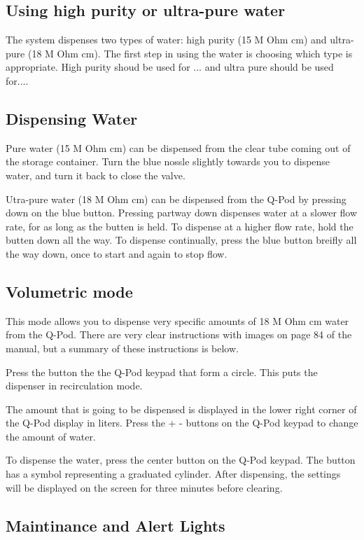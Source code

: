 \documentclass[12pt]{../SOP3_beta}\usepackage[]{graphicx}\usepackage[]{color}
\begin{document}
\subsection{Using high purity or ultra-pure water}

\NP The system dispenses two types of water: high purity (15 M Ohm cm) and ultra-pure (18 M Ohm cm). The first step in using the water is choosing which type is appropriate. High purity shoud be used for ... and ultra pure should be used for....

\subsection{Dispensing Water}

\NP Pure water (15 M Ohm cm) can be dispensed from the clear tube coming out of the storage container. Turn the blue nossle slightly towards you to dispense water, and turn it back to close the valve. 

\NP Utra-pure water (18 M Ohm cm) can be dispensed from the Q-Pod by pressing down on the blue button. Pressing partway down dispenses water at a slower flow rate, for as long as the butten is held. To dispense at a higher flow rate, hold the butten down all the way. To dispense continually, press the blue button breifly all the way down, once to start and again to stop flow.  

\subsection{Volumetric mode}

\NP This mode allows you to dispense very specific amounts of 18 M Ohm cm water from the Q-Pod. There are very clear instructions with images on page 84 of the manual, but a summary of these instructions is below.

\NP Press the button the the Q-Pod keypad that form a circle. This puts the dispenser in recirculation mode. 

\NP The amount that is going to be dispensed is displayed in the lower right corner of the Q-Pod display in liters. Press the + - buttons on the Q-Pod keypad to change the amount of water. 

\NP To dispense the water, press the center button on the Q-Pod keypad. The button has a symbol representing a graduated cylinder. After dispensing, the settings will be displayed on the screen for three minutes before clearing.

\subsection{Maintinance and Alert Lights}
\end{document}
